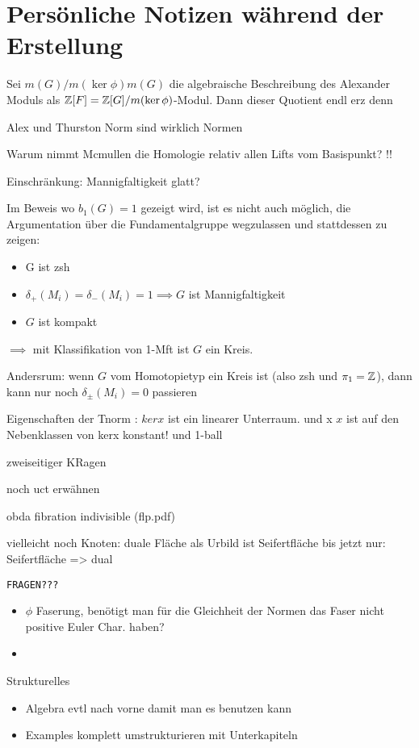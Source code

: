 
\section{Persönliche Notizen während der Erstellung}
	Sei $m(G)/m(\ker \phi)m(G)$ die algebraische Beschreibung des Alexander Moduls als $\mathbb{Z}[F]=\mathbb{Z}[G]/m(\ker \phi)$-Modul. Dann dieser Quotient endl erz denn

	Alex und Thurston Norm sind wirklich Normen 

	Warum nimmt Mcmullen die Homologie relativ allen Lifts vom Basispunkt?  !!

	Einschränkung: Mannigfaltigkeit glatt?

	Im Beweis wo $b_1(G)=1$ gezeigt wird, ist es nicht auch möglich, die Argumentation über die Fundamentalgruppe wegzulassen und stattdessen zu zeigen:
	\begin{itemize}
		\item G ist zsh
		\item $\delta_+(M_i) = \delta_-(M_i)=1 \implies G$ ist Mannigfaltigkeit
		\item $G$ ist kompakt
	\end{itemize}
	$\implies$ mit Klassifikation von 1-Mft ist $G$ ein Kreis.

	Andersrum: wenn $G$ vom Homotopietyp ein Kreis ist (also zsh und $\pi_1=\mathbb{Z}$), dann kann nur noch $\delta_\pm(M_i)=0$ passieren

	Eigenschaften der Tnorm : $kerx$ ist ein linearer Unterraum. und x $x$ ist auf den Nebenklassen von kerx konstant! und 1-ball

	zweiseitiger KRagen

	noch uct erwähnen

	obda fibration indivisible (flp.pdf)


	vielleicht noch Knoten: duale Fläche als Urbild ist Seifertfläche
	bis jetzt nur: Seifertfläche => dual

\texttt{FRAGEN???}
	\begin{itemize}
		\item $\phi$ Faserung, benötigt man für die Gleichheit der Normen das Faser nicht positive Euler Char. haben?
		\item 
	\end{itemize}

	{Strukturelles}
	\begin{itemize}
		\item Algebra evtl nach vorne damit man es benutzen kann
		\item Examples komplett umstrukturieren mit Unterkapiteln
	\end{itemize}